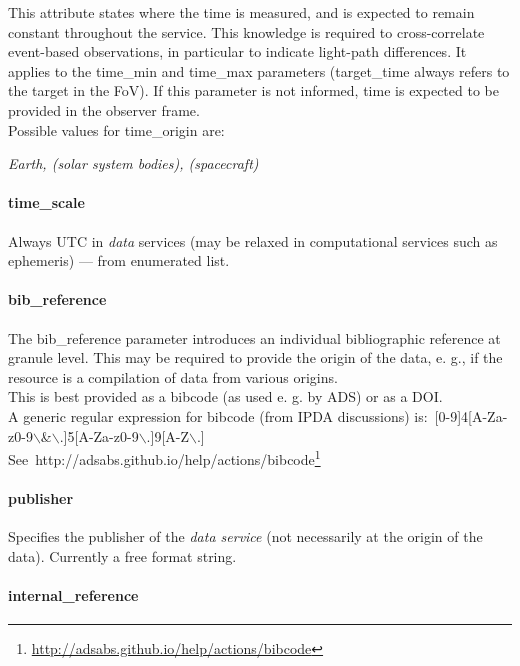 \documentclass[11pt,a4paper]{ivoa}
\begin{document}
This attribute states where the time is measured, and is expected to remain constant throughout the service. This knowledge is required to cross-correlate event-based observations, in particular to indicate light-path differences. It applies to the time\_min and time\_max parameters (target\_time always refers to the target in the FoV). If this parameter is not informed, time is expected to be provided in the observer frame.\\ Possible values for time\_origin are:

\emph{Earth, (solar system bodies), (spacecraft)}

\paragraph{time\_scale}

Always UTC in \emph{data} services (may be relaxed in computational services such as ephemeris) — from enumerated list.

\paragraph{bib\_reference}

The bib\_reference parameter introduces an individual bibliographic reference at granule level. This may be required to provide the origin of the data, e. g., if the resource is a compilation of data from various origins.\\ This is best provided as a bibcode (as used e. g. by ADS) or as a DOI. \\A generic regular expression for bibcode (from IPDA discussions) is: [0-9]{4}[A-Za-z0-9$\backslash$\&$\backslash$.]{5}[A-Za-z0-9$\backslash$.]{9}[A-Z$\backslash$.]\\See http://adsabs.github.io/help/actions/bibcode\footnote{\url{http://adsabs.github.io/help/actions/bibcode}}

\paragraph{publisher}

Specifies the publisher of the \emph{data service} (not necessarily at the origin of the data). Currently a free format string.\\

\paragraph{internal\_reference}
\end{document}

